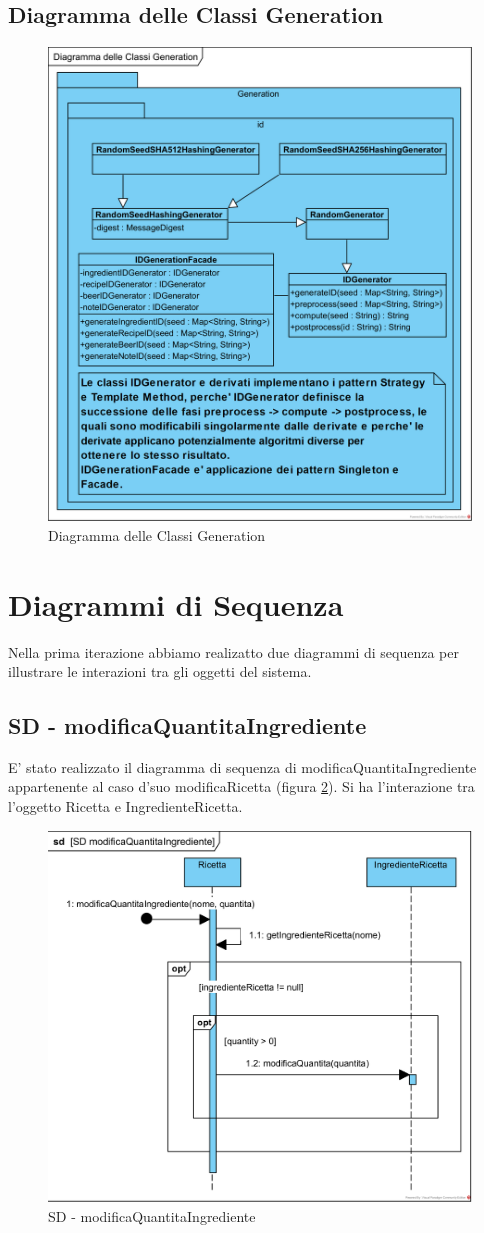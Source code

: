 \documentclass[a4paper,12pt]{report}
\begin{document}
		\subsection{Diagramma delle Classi Generation}
			\begin{figure}[!h]
				\centering
				\includegraphics[width=0.3\linewidth]{image/Diagramma-delle-Classi-Generation.png}
				\caption{Diagramma delle Classi Generation}\label{fig:1}
			\end{figure}  
			
    \newpage
      	\section{Diagrammi di Sequenza} 
	Nella prima iterazione abbiamo realizatto due diagrammi di sequenza per illustrare le interazioni tra gli oggetti del sistema.
		\subsection{SD - modificaQuantitaIngrediente}
			E' stato realizzato il diagramma di sequenza di modificaQuantitaIngrediente appartenente al caso d'suo modificaRicetta (figura \ref{fig:SD-modificaQuantitaIngrediente}).
			Si ha l'interazione tra l'oggetto Ricetta e IngredienteRicetta.
			\begin{figure}[!h]
				\centering
				\includegraphics[width=0.7\linewidth]{image/SD-modificaQuantitaIngrediente.png}
				\caption{SD - modificaQuantitaIngrediente}\label{fig:SD-modificaQuantitaIngrediente}
			\end{figure}	
		\newpage	
\end{document}
